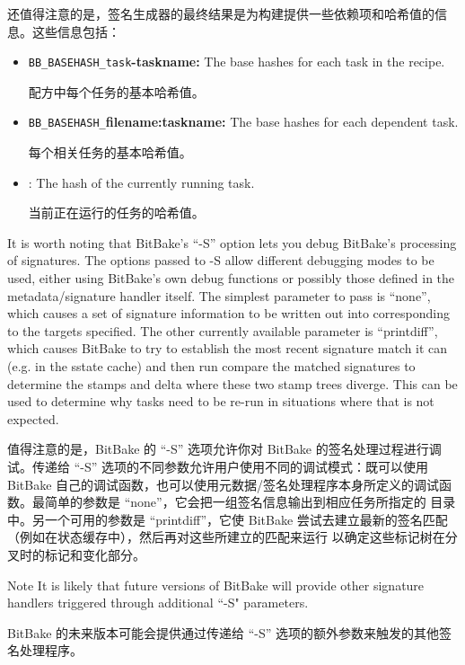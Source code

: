 还值得注意的是，签名生成器的最终结果是为构建提供一些依赖项和哈希值的信息。这些信息包括：

\begin{itemize}
\setlength\itemsep{1.0em}
\item \texttt{BB\_BASEHASH\_task}\textbf{-taskname:} The base hashes for each task in the recipe.\par
配方中每个任务的基本哈希值。

\item \texttt{BB\_BASEHASH\_}\textbf{filename:taskname:} The base hashes for each dependent task.\par
每个相关任务的基本哈希值。

\item {}: The hash of the currently running task.\par
当前正在运行的任务的哈希值。
\end{itemize}

It is worth noting that BitBake's ``-S'' option lets you debug BitBake's processing of signatures. The options passed to -S allow different debugging modes to be used, either using BitBake's own debug functions or possibly those defined in the metadata/signature handler itself. The simplest parameter to pass is ``none'', which causes a set of signature information to be written out into  corresponding to the targets specified. The other currently available parameter is ``printdiff'', which causes BitBake to try to establish the most recent signature match it can (e.g. in the sstate cache) and then run compare the matched signatures to determine the stamps and delta where these two stamp trees diverge. This can be used to determine why tasks need to be re-run in situations where that is not expected.

值得注意的是，BitBake 的 ``-S'' 选项允许你对 BitBake 的签名处理过程进行调试。传递给 ``-S'' 选项的不同参数允许用户使用不同的调试模式：既可以使用 BitBake 自己的调试函数，也可以使用元数据/签名处理程序本身所定义的调试函数。最简单的参数是 ``none''，它会把一组签名信息输出到相应任务所指定的  目录中。另一个可用的参数是 ``printdiff''，它使 BitBake 尝试去建立最新的签名匹配（例如在状态缓存中），然后再对这些所建立的匹配来运行  以确定这些标记树在分叉时的标记和变化部分。



\begin{noteblock}{Note}%
It is likely that future versions of BitBake will provide other signature handlers triggered through additional ``-S" parameters.

\medskip
BitBake 的未来版本可能会提供通过传递给 ``-S'' 选项的额外参数来触发的其他签名处理程序。
\end{noteblock}


